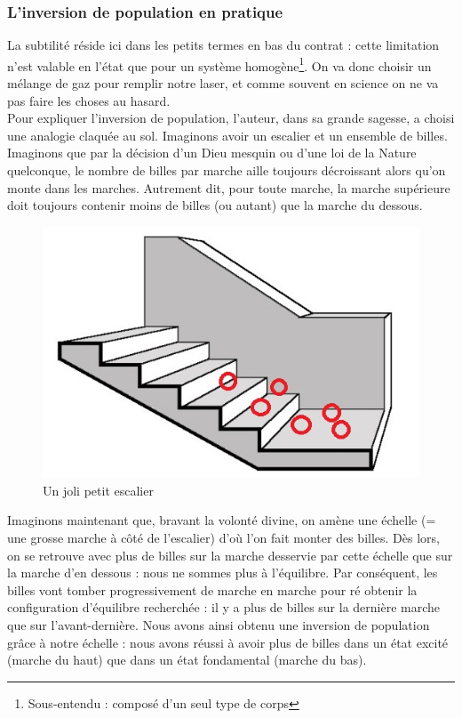 \subsubsection{L'inversion de population en pratique}


La subtilité réside ici dans les petits termes en bas du contrat : cette limitation n'est valable en l'état que pour un système homogène\footnote{Sous-entendu : composé d'un seul type de corps}. On va donc choisir un mélange de gaz pour remplir notre laser, et comme souvent en science on ne va pas faire les choses au hasard.\\

Pour expliquer l'inversion de population, l'auteur, dans sa grande sagesse, a choisi une analogie claquée au sol. Imaginons avoir un escalier et un ensemble de billes. Imaginons que par la décision d'un Dieu mesquin ou d'une loi de la Nature quelconque, le nombre de billes par marche aille toujours décroissant alors qu'on monte dans les marches. Autrement dit, pour toute marche, la marche supérieure doit toujours contenir moins de billes (ou autant) que la marche du dessous.

\begin{figure}[htp]
    \centering
    \includegraphics[scale=1.0]{Images2/escalier2.jpg}
    \caption{Un joli petit escalier}
    \label{fig:escalier}
\end{figure}
Imaginons maintenant que, bravant la volonté divine, on amène une échelle (= une grosse marche à côté de l'escalier) d'où l'on fait monter des billes. Dès lors, on se retrouve avec plus de billes sur la marche desservie par cette échelle que sur la marche d'en dessous : nous ne sommes plus à l'équilibre. Par conséquent, les billes vont tomber progressivement de marche en marche pour ré obtenir la configuration d'équilibre recherchée : il y a plus de billes sur la dernière marche que sur l'avant-dernière. Nous avons ainsi obtenu une inversion de population grâce à notre échelle : nous avons réussi à avoir plus de billes dans un état excité (marche du haut) que dans un état fondamental (marche du bas).\\




